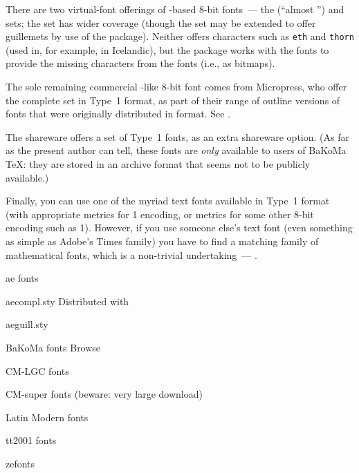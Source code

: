 There are two virtual-font offerings of -based 8-bit
fonts~--- the  (``almost '') and
 sets; the  set has wider coverage
(though the  set may be extended to offer guillemets by
use of the  package).  Neither offers characters such
as \texttt{eth} and \texttt{thorn} (used in, for example, in
Icelandic), but the  package works with the
 fonts to provide the missing characters from the
 fonts (i.e., as bitmaps).

The sole remaining commercial -like 8-bit font comes from
Micropress, who offer the complete  set
in Type~1 format, as part of their range of outline versions of fonts
that were originally distributed in \MF{} format.  See
.

The shareware %
 offers a
set of Type~1  fonts, as an extra shareware option.  (As far
as the present author can tell, these fonts are \emph{only} available
to users of BaKoMa \TeX{}: they are stored in an archive format that
seems not to be publicly available.)

Finally, you can use one of the myriad text fonts available in Type~1
format (with appropriate  metrics for 1 encoding,
or metrics for some other 8-bit encoding such as 1).  However,
if you use someone else's text font (even something as simple as
Adobe's Times family) you have to find a matching family of
mathematical fonts, which is a non-trivial undertaking~---
.
\begin{ctanrefs}
\item[\nothtml{\rmfamily}ae fonts]
\item[aecompl.sty]Distributed with 
\item[aeguill.sty]
\item[\nothtml{\rmfamily}BaKoMa fonts]Browse 
\item[\nothtml{\rmfamily}CM-LGC fonts]
\item[\nothtml{\rmfamily}CM-super fonts] (beware:
  very large download)
\item[\nothtml{\rmfamily}Latin Modern fonts]
\item[\nothtml{\rmfamily}tt2001 fonts]
\item[\nothtml{\rmfamily}zefonts]
\end{ctanrefs}


